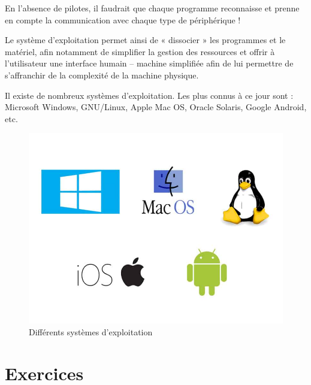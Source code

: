 \documentclass[11pt, a4paper]{book}
\begin{document}
	En l’absence de pilotes, il faudrait que chaque programme reconnaisse et prenne en compte la communication avec chaque type de périphérique !
	
	Le système d’exploitation permet ainsi de « dissocier » les programmes et le matériel, afin
notamment de simplifier la gestion des ressources et offrir à l’utilisateur une interface humain – machine simplifiée afin de lui permettre de s’affranchir de la complexité de la machine physique.	
	
	
	Il existe de nombreux systèmes d’exploitation. Les plus connus à ce jour sont : Microsoft Windows, GNU/Linux, Apple Mac OS, Oracle Solaris, Google Android, etc.

\begin{figure}[h]
	\centering
	\includegraphics[scale=.3]{images/OS}
	\caption{Différents systèmes d'exploitation}
\end{figure}


\newpage

\section{Exercices}
\end{document}
